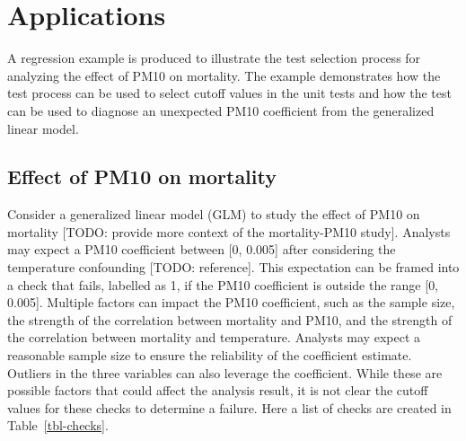 \documentclass[
  12pt,
]{interact}
\begin{document}
\section{Applications}\label{sec-examples}

A regression example is produced to illustrate the test selection
process for analyzing the effect of PM10 on mortality. The example
demonstrates how the test process can be used to select cutoff values in
the unit tests and how the test can be used to diagnose an unexpected
PM10 coefficient from the generalized linear model.

\subsection{Effect of PM10 on mortality}\label{sec-pm10-mortality}

Consider a generalized linear model (GLM) to study the effect of PM10 on
mortality {[}TODO: provide more context of the mortality-PM10 study{]}.
Analysts may expect a PM10 coefficient between {[}0, 0.005{]} after
considering the temperature confounding {[}TODO: reference{]}. This
expectation can be framed into a check that fails, labelled as 1, if the
PM10 coefficient is outside the range {[}0, 0.005{]}. Multiple factors
can impact the PM10 coefficient, such as the sample size, the strength
of the correlation between mortality and PM10, and the strength of the
correlation between mortality and temperature. Analysts may expect a
reasonable sample size to ensure the reliability of the coefficient
estimate. Outliers in the three variables can also leverage the
coefficient. While these are possible factors that could affect the
analysis result, it is not clear the cutoff values for these checks to
determine a failure. Here a list of checks are created in
Table~\ref{tbl-checks}.
\end{document}
